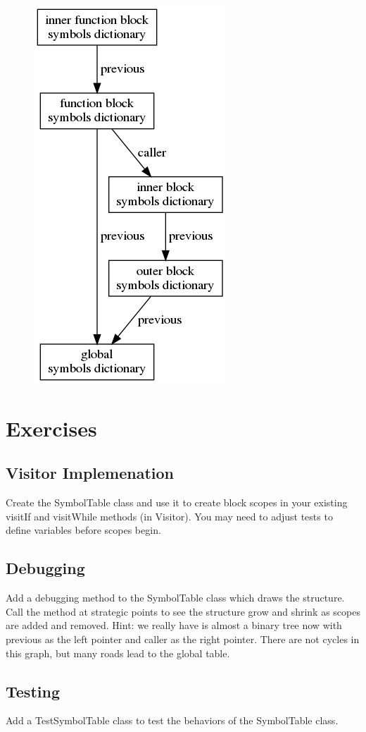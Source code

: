 \begin{figure}
\centering
\includegraphics{functionscopesymboltable.png}
\end{figure}

\section{Exercises}

\subsection{Visitor Implemenation}

Create the SymbolTable class and use it to create block scopes
in your existing visitIf and visitWhile methods (in Visitor). You
may need to adjust tests to define variables before scopes begin.

\subsection{Debugging}

Add a debugging method to the SymbolTable class which draws the
structure.
Call the method at strategic points to see the structure grow and
shrink as scopes are added and removed.
Hint: we really have is almost a binary tree now with previous
as the left pointer and caller as the right pointer. There are not
cycles in this graph, but many roads lead to the global table.

\subsection{Testing}

Add a TestSymbolTable class to test the behaviors of the SymbolTable class.
